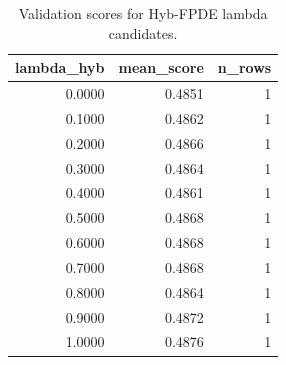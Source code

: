 \begin{table}[t]
\caption{Validation scores for Hyb-FPDE lambda candidates.}
\label{tab:lambda_distribution_computed}
\centering
\begin{tabular}{rrr}
\toprule
lambda\_hyb & mean\_score & n\_rows \\
\midrule
0.0000 & 0.4851 & 1 \\
0.1000 & 0.4862 & 1 \\
0.2000 & 0.4866 & 1 \\
0.3000 & 0.4864 & 1 \\
0.4000 & 0.4861 & 1 \\
0.5000 & 0.4868 & 1 \\
0.6000 & 0.4868 & 1 \\
0.7000 & 0.4868 & 1 \\
0.8000 & 0.4864 & 1 \\
0.9000 & 0.4872 & 1 \\
1.0000 & 0.4876 & 1 \\
\bottomrule
\end{tabular}

\end{table}
